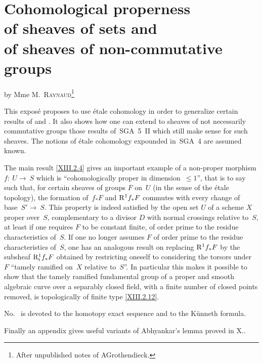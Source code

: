 \chapter[Cohomological properness of sheaves of sets...]{Cohomological properness\\ of sheaves of sets and\\ of sheaves of non-commutative groups}
\label{XIII}

\begin{center}
{by Mme M.\ \textsc{Raynaud}\footnote{After unpublished notes of
A\ptbl Grothendieck.}}
\end{center}
\vspace*{1cm}

This expos\'e proposes to use \'etale cohomology in order to
generalize certain results of  and . It also shows
how one can extend to sheaves of not necessarily commutative groups
those results of~SGA~5~II which still make sense for such
sheaves. The notions of \'etale cohomology expounded in~SGA~4 are
assumed known.

The main result \eqref{XIII.2.4} gives an important example
of a non-proper morphism $f\colon~U\to~S$ which is ``cohomologically
proper in dimension~$\leq1$'', that is to say such that, for
certain sheaves of groups $F$ on~$U$ (in the sense of the \'etale
topology), the formation of~$f_*F$ and $\mathrm{R}^1f_*F$ commutes with every
change of base~$S'\to~S$. This property is indeed
satisfied by the open set $U$ of a scheme $X$ proper over~$S$,
complementary to a divisor $D$ with normal crossings
relative to~$S$, at least if one requires $F$ to be
constant finite, of order prime to the residue
characteristics of~$S$. If one no longer assumes $F$ of order prime
to the residue characteristics of~$S$, one has an
analogous result on replacing $\mathrm{R}^1f_*F$ by the subsheaf
$\mathrm{R}^1_{\mathrm{t}}f_*F$ obtained by restricting oneself to considering the torsors
under~$F$ ``tamely ramified on~$X$ relative
to~$S$''. In particular this makes it possible to show that the tamely
ramified fundamental group of a proper and smooth algebraic
curve over a separably closed field, with a finite number of
closed points removed, is topologically of finite type
\eqref{XIII.2.12}.

No.~ is devoted to the homotopy exact sequence and to
the K\"unneth formula.

Finally an appendix gives useful variants of Abhyankar's lemma
proved in X..

\setcounter{section}{-1}

